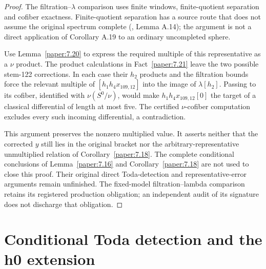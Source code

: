 \begin{proof}
The filtration--$\lambda$ comparison uses finite windows, finite-quotient separation and cofiber exactness. Finite-quotient separation has a source route that does not assume the original spectrum complete (\cite{BHS}, Lemma A.14); the argument is not a direct application of Corollary A.19 to an ordinary uncompleted sphere.

Use Lemma~\ref{paper:7.20} to express the required multiple of this representative as a $\nu$ product. The product calculations in Fact~\ref{paper:7.21} leave the two possible stem-122 corrections. In each case their $h_2$ products and the filtration bounds force the relevant multiple of $[h_1h_4x_{109,12}]$ into the image of $\lambda[h_2]$. Passing to its cofiber, identified with $\nu(S^0/\nu)$, would make $h_1h_4x_{109,12}[0]$ the target of a classical differential of length at most five. The certified $\nu$-cofiber computation excludes every such incoming differential, a contradiction.

This argument preserves the nonzero multiplied value. It asserts neither that the corrected $y$ still lies in the original bracket nor the arbitrary-representative unmultiplied relation of Corollary~\ref{paper:7.18}. The complete conditional conclusions of Lemma~\ref{paper:7.16} and Corollary~\ref{paper:7.18} are not used to close this proof. Their original direct Toda-detection and representative-error arguments remain unfinished. The fixed-model filtration--lambda comparison retains its registered production obligation; an independent audit of its signature does not discharge that obligation.
\end{proof}

\section{Conditional Toda detection and the h0 extension}

